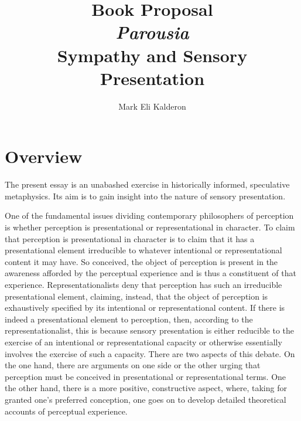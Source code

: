 \documentclass[12pt]{article}
\newcommand\myauthor{Mark Eli Kalderon}
\begin{document}
\author{\myauthor}
\title{Book Proposal\\
\emph{Parousia}\\
Sympathy and Sensory Presentation}
\date{}

\maketitle

\setlength{\parindent}{1em}


\section{Overview} %
\label{sec:overview}

The present essay is an unabashed exercise in historically informed, speculative metaphysics. Its aim is to gain insight into the nature of sensory presentation.

One of the fundamental issues dividing contemporary philosophers of perception is whether perception is presentational or representational in character. To claim that perception is presentational in character is to claim that it has a presentational element irreducible to whatever intentional or representational content it may have. So conceived, the object of perception is present in the awareness afforded by the perceptual experience and is thus a constituent of that experience. Representationalists deny that perception has such an irreducible presentational element, claiming, instead, that the object of perception is exhaustively specified by its intentional or representational content. If there is indeed a presentational element to perception, then, according to the representationalist, this is because sensory presentation is either reducible to the exercise of an intentional or representational capacity or otherwise essentially involves the exercise of such a capacity. There are two aspects of this debate. On the one hand, there are arguments on one side or the other urging that perception must be conceived in presentational or representational terms. One the other hand, there is a more positive, constructive aspect, where, taking for granted one’s preferred conception, one goes on to develop detailed theoretical accounts of perceptual experience.
\end{document}
